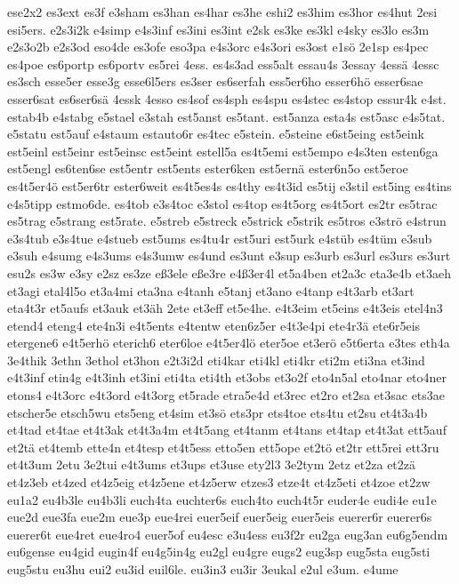 {ese2x2
es3ext
es3f
e3sham
es3han
es4har
es3he
eshi2
es3him
es3hor
es4hut
2esi
esi5ers.
e2s3i2k
e4simp
e4s3inf
es3ini
es3int
e2sk
es3ke
es3kl
e4sky
es3lo
es3m
e2s3o2b
e2s3od
eso4de
es3ofe
eso3pa
e4s3orc
e4s3ori
es3ost
e1sö
2e1sp
es4pec
es4poe
es6portp
es6portv
es5rei
4ess.
es4s3ad
ess5alt
essau4s
3essay
4essä
4essc
es3sch
esse5er
esse3g
esse6l5ers
es3ser
es6serfah
ess5er6ho
esser6hö
esser6sae
esser6sat
es6ser6sä
4essk
4esso
es4sof
es4sph
es4spu
es4stec
es4stop
essur4k
e4st.
estab4b
e4stabg
e5stael
e3stah
est5anst
es5tant.
est5anza
esta4s
est5asc
e4s5tat.
e5statu
est5auf
e4staum
estauto6r
es4tec
e5stein.
e5steine
e6st5eing
est5eink
est5einl
est5einr
est5einsc
est5eint
estell5a
es4t5emi
est5empo
e4s3ten
esten6ga
est5engl
es6ten6se
est5entr
est5ents
ester6ken
est5ernä
ester6n5o
est5eroe
es4t5er4ö
est5er6tr
ester6weit
es4t5es4s
es4thy
es4t3id
es5tij
e3stil
est5ing
es4tins
e4s5tipp
estmo6de.
es4tob
e3s4toc
e3stol
es4top
es4t5org
es4t5ort
es2tr
es5trac
es5trag
e5strang
est5rate.
e5streb
e5streck
e5strick
e5strik
es5tros
e3strö
e4strun
e3s4tub
e3s4tue
e4stueb
est5ums
es4tu4r
est5uri
est5urk
e4stüb
es4tüm
e3sub
e3suh
e4sumg
e4s3ums
e4s3umw
es4und
es3unt
e3sup
es3urb
es3url
es3urs
es3urt
esu2s
es3w
e3sy
e2sz
es3ze
eß3ele
eße3re
e4ß3er4l
et5a4ben
et2a3c
eta3e4b
et3aeh
et3agi
etal4l5o
et3a4mi
eta3na
e4tanh
e5tanj
et3ano
e4tanp
e4t3arb
et3art
eta4t3r
et5aufs
et3auk
et3äh
2ete
et3eff
et5e4he.
e4t3eim
et5eins
e4t3eis
etel4n3
etend4
eteng4
ete4n3i
e4t5ents
e4tentw
eten6z5er
e4t3e4pi
ete4r3ä
ete6r5eis
etergene6
e4t5erhö
eterich6
eter6loe
e4t5er4lö
eter5oe
et3erö
e5t6erta
e3tes
eth4a
3e4thik
3ethn
3ethol
et3hon
e2t3i2d
eti4kar
eti4kl
eti4kr
eti2m
eti3na
et3ind
e4t3inf
etin4g
e4t3inh
et3ini
eti4ta
eti4th
et3obs
et3o2f
eto4n5al
eto4nar
eto4ner
etons4
e4t3orc
e4t3ord
e4t3org
et5rade
etra5e4d
et3rec
et2ro
et2sa
et3sac
ets3ae
etscher5e
etsch5wu
ets5eng
et4sim
et3sö
ets3pr
ets4toe
ets4tu
et2su
et4t3a4b
et4tad
et4tae
et4t3ak
et4t3a4m
et4t5ang
et4tanm
et4tans
et4tap
et4t3at
ett5auf
et2tä
et4temb
ette4n
et4tesp
et4t5ess
etto5en
ett5ope
et2tö
et2tr
ett5rei
ett3ru
et4t3um
2etu
3e2tui
e4t3ums
et3ups
et3use
ety2l3
3e2tym
2etz
et2za
et2zä
et4z3eb
et4zed
et4z5eig
et4z5ene
et4z5erw
etzes3
etze4t
et4z5eti
et4zoe
et2zw
eu1a2
eu4b3le
eu4b3li
euch4ta
euchter6s
euch4to
euch4t5r
euder4e
eudi4e
eu1e
eue2d
eue3fa
eue2m
eue3p
eue4rei
euer5eif
euer5eig
euer5eis
euerer6r
euerer6s
euerer6t
eue4ret
eue4ro4
euer5of
eu4esc
e3u4ess
eu3f2r
eu2ga
eug3an
eu6g5endm
eu6gense
eu4gid
eugin4f
eu4g5in4g
eu2gl
eu4gre
eugs2
eug3sp
eug5sta
eug5sti
eug5stu
eu3hu
eui2
eu3id
euil6le.
eu3in3
eu3ir
3eukal
e2ul
e3um.
e4ume
}
